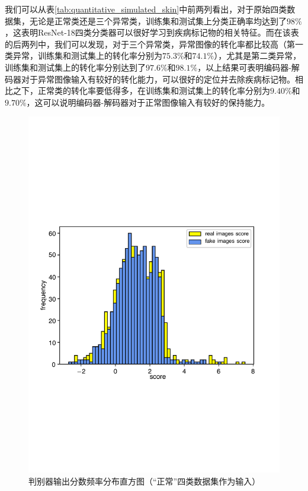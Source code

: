 我们可以从表\ref{tab:quantitative_simulated_skin}中前两列看出，对于原始四类数据集，无论是正常类还是三个异常类，训练集和测试集上分类正确率均达到了$98\%$，这表明ResNet-18四类分类器可以很好学习到疾病标记物的相关特征。而在该表的后两列中，我们可以发现，对于三个异常类，异常图像的转化率都比较高（第一类异常，训练集和测试集上的转化率分别为$75.3\%$和$74.1\%$），尤其是第二类异常，训练集和测试集上的转化率分别达到了$97.6\%$和$98.1\%$，以上结果可表明编码器-解码器对于异常图像输入有较好的转化能力，可以很好的定位并去除疾病标记物。相比之下，正常类的转化率要低得多，在训练集和测试集上的转化率分别为$9.40\%$和$9.70\%$，这可以说明编码器-解码器对于正常图像输入有较好的保持能力。
\begin{figure}[h]
	\centering
	\includegraphics[width=1.0\textwidth]{figure/simulated_skin_score_distribution.pdf}
	\caption{判别器输出分数频率分布直方图（“正常”四类数据集作为输入）}
	\label{fig:simulated_skin_hist_freq}
\end{figure}

